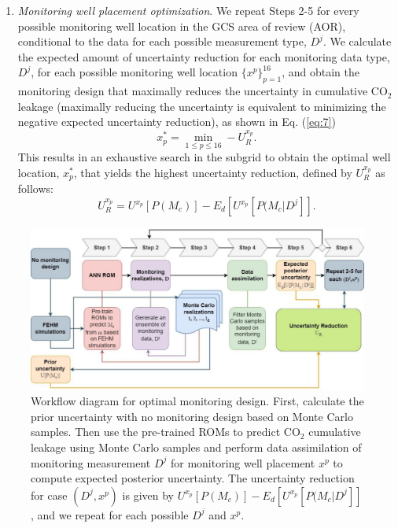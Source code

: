 \documentclass[a4paper,fleqn]{cas-sc}
\begin{document}
\begin{enumerate}[Step 1.]
\item \textit{Monitoring well placement optimization}. We repeat Steps 2-5 for every possible monitoring well location in the GCS area of review (AOR), conditional to the data for each possible measurement type, $D^j$. We calculate the expected amount of uncertainty reduction for each monitoring data type, $D^j$, for each possible monitoring well location $\{{x^p}\}_{p=1}^{16}$, and obtain the monitoring design that maximally reduces the uncertainty in cumulative CO$_2$ leakage (maximally reducing the uncertainty is equivalent to minimizing the negative expected uncertainty reduction), as shown in Eq. (\ref{eq:7})
\begin{equation} \label{eq:7}
    x_p^* = \min\limits_{1\leq p \leq 16} -U_R^{x_p} .
\end{equation}
This results in an exhaustive search in the subgrid to obtain the optimal well location, $x_p^*$, that yields the highest uncertainty reduction, defined by $U_R^{x_p}$ as follows:
\begin{equation} \label{eq:8}
    U_R^{x_p} = U^{x_p}[P(M_c)] - E_d[U^{x_p}[P(M_c \vert D^j]] .
\end{equation}
\end{enumerate}

\begin{figure}
    \centering
    \includegraphics[width=16.5cm]{figs/Figure 4.pdf}
    \caption{Workflow diagram for optimal monitoring design. First, calculate the prior uncertainty with no monitoring design based on Monte Carlo samples. Then use the pre-trained ROMs to predict CO$_2$ cumulative leakage using Monte Carlo samples and perform data assimilation of monitoring measurement $D^j$ for monitoring well placement $x^p$ to compute expected posterior uncertainty. The uncertainty reduction for case $(D^j,x^p)$ is given by $U^{x_p}[P(M_c)] - E_d[U^{x_p}[P(M_c \vert D^j]]$, and we repeat for each possible $D^j$ and $x^p$.}
    \label{opt_workflow}
\end{figure}
\end{document}
